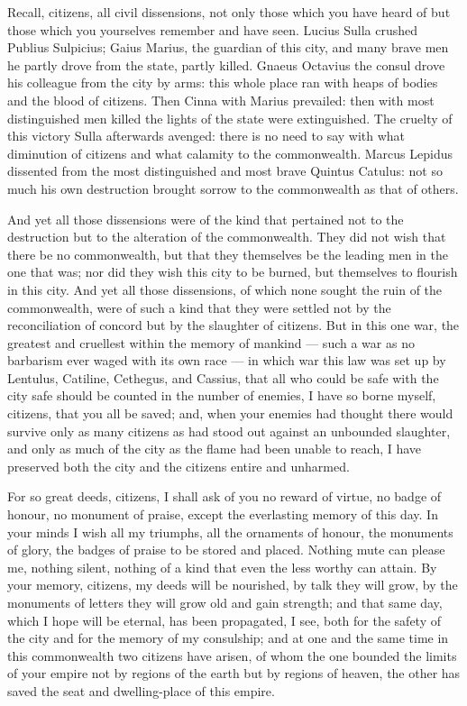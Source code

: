  Recall, citizens, all civil dissensions, not only those which you have heard of but those which you yourselves remember and have seen. Lucius Sulla crushed Publius Sulpicius; Gaius Marius, the guardian of this city, and many brave men he partly drove from the state, partly killed. Gnaeus Octavius the consul drove his colleague from the city by arms: this whole place ran with heaps of bodies and the blood of citizens. Then Cinna with Marius prevailed: then with most distinguished men killed the lights of the state were extinguished. The cruelty of this victory Sulla afterwards avenged: there is no need to say with what diminution of citizens and what calamity to the commonwealth. Marcus Lepidus dissented from the most distinguished and most brave Quintus Catulus: not so much his own destruction brought sorrow to the commonwealth as that of others.

 And yet all those dissensions were of the kind that pertained not to the destruction but to the alteration of the commonwealth. They did not wish that there be no commonwealth, but that they themselves be the leading men in the one that was; nor did they wish this city to be burned, but themselves to flourish in this city. And yet all those dissensions, of which none sought the ruin of the commonwealth, were of such a kind that they were settled not by the reconciliation of concord but by the slaughter of citizens. But in this one war, the greatest and cruellest within the memory of mankind --- such a war as no barbarism ever waged with its own race --- in which war this law was set up by Lentulus, Catiline, Cethegus, and Cassius, that all who could be safe with the city safe should be counted in the number of enemies, I have so borne myself, citizens, that you all be saved; and, when your enemies had thought there would survive only as many citizens as had stood out against an unbounded slaughter, and only as much of the city as the flame had been unable to reach, I have preserved both the city and the citizens entire and unharmed.

 For so great deeds, citizens, I shall ask of you no reward of virtue, no badge of honour, no monument of praise, except the everlasting memory of this day. In your minds I wish all my triumphs, all the ornaments of honour, the monuments of glory, the badges of praise to be stored and placed. Nothing mute can please me, nothing silent, nothing of a kind that even the less worthy can attain. By your memory, citizens, my deeds will be nourished, by talk they will grow, by the monuments of letters they will grow old and gain strength; and that same day, which I hope will be eternal, has been propagated, I see, both for the safety of the city and for the memory of my consulship; and at one and the same time in this commonwealth two citizens have arisen, of whom the one bounded the limits of your empire not by regions of the earth but by regions of heaven, the other has saved the seat and dwelling-place of this empire.

